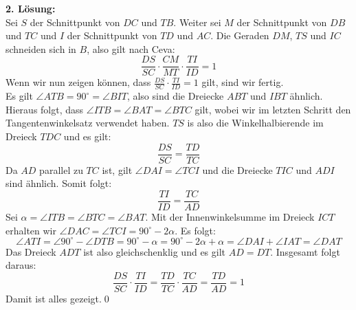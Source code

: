 \documentclass[12pt,a4paper]{article}
\theoremstyle{plain}
\theoremstyle{definition}
\begin{document}
\begin{itemize}
\begin{center}
\end{center}
\textbf{2. Lösung:}\\
Sei $S$ der Schnittpunkt von $DC$ und $TB$. Weiter sei $M$ der Schnittpunkt von $DB$ und $TC$ und $I$ der Schnittpunkt von $TD$ und $AC$. Die Geraden $DM$, $TS$ und $IC$ schneiden sich in $B$, also gilt nach Ceva:
\[\frac{DS}{SC}\cdot\frac{CM}{MT}\cdot\frac{TI}{ID}=1\]
Wenn wir nun zeigen können, dass $\frac{DS}{SC}\cdot\frac{TI}{ID}=1$ gilt, sind wir fertig.\\
Es gilt $\angle ATB=90^\circ=\angle BIT$, also sind die Dreiecke $ABT$ und $IBT$ ähnlich. Hieraus folgt, dass $\angle ITB=\angle BAT=\angle BTC$ gilt, wobei wir im letzten Schritt den Tangentenwinkelsatz verwendet haben. $TS$ is also die Winkelhalbierende im Dreieck $TDC$ und es gilt:
\[\frac{DS}{SC}=\frac{TD}{TC}\]
Da $AD$ parallel zu $TC$ ist, gilt $\angle DAI=\angle TCI$ und die Dreiecke $TIC$ und $ADI$ sind ähnlich. Somit folgt:
\[\frac{TI}{ID}=\frac{TC}{AD}\]
Sei $\alpha=\angle ITB=\angle BTC=\angle BAT$. Mit der Innenwinkelsumme im Dreieck $ICT$ erhalten wir $\angle DAC=\angle TCI=90^\circ-2\alpha$. Es folgt:
\[\angle ATI=\angle 90^\circ-\angle DTB=90^\circ-\alpha=90^\circ-2\alpha+\alpha=\angle DAI+\angle IAT=\angle DAT\]
Das Dreieck $ADT$ ist also gleichschenklig und es gilt $AD=DT$. Insgesamt folgt daraus:
\[\frac{DS}{SC}\cdot\frac{TI}{ID}=\frac{TD}{TC}\cdot\frac{TC}{AD}=\frac{TD}{AD}=1\]
Damit ist alles gezeigt.\qed
\end{itemize}
\end{document}
